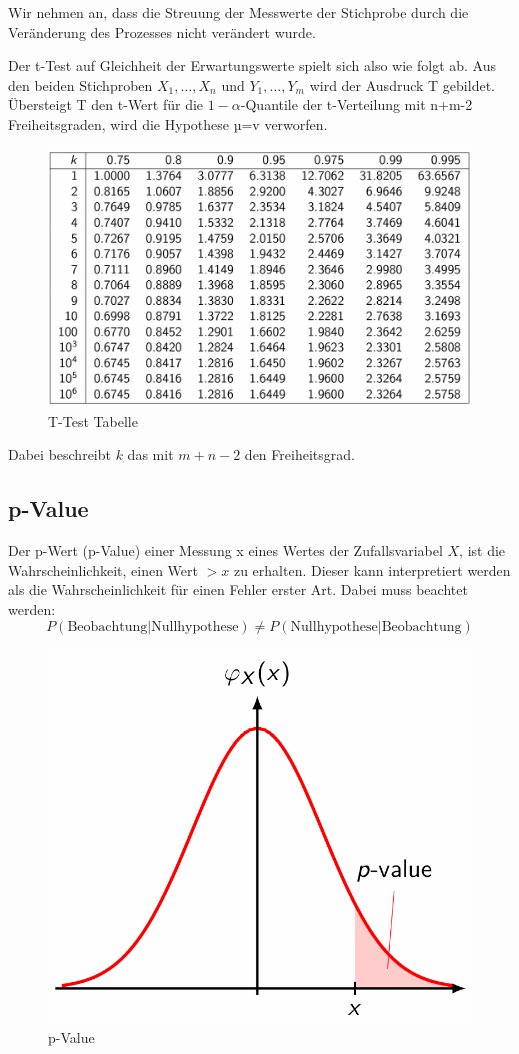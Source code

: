 \documentclass[../Main.tex]{subfiles}
\begin{document}
Wir nehmen an, dass die Streuung der Messwerte der Stichprobe durch die Veränderung des Prozesses
nicht verändert wurde.

Der t-Test auf Gleichheit der Erwartungswerte spielt sich also wie folgt ab. Aus den beiden
Stichproben \(X_1,\dots,X_n\) und \(Y_1,\dots,Y_m\) wird der Ausdruck T gebildet. Übersteigt T den
t-Wert für die \(1-\alpha\)-Quantile der t-Verteilung mit n+m-2 Freiheitsgraden, wird die Hypothese
µ=v verworfen.

\begin{figure}[H]
    \centering
    \includegraphics[width=1\linewidth]{Images/t-test-tabelle.png}
    \caption{T-Test Tabelle}
\end{figure}
Dabei beschreibt \(k\) das mit \(m+n-2\) den Freiheitsgrad.

\subsection{p-Value}
Der p-Wert (p-Value) einer Messung x eines Wertes
der Zufallsvariabel \(X\), ist die Wahrscheinlichkeit,
einen Wert \(> x\) zu erhalten.
Dieser kann interpretiert werden als die Wahrscheinlichkeit für einen Fehler erster Art.
Dabei muss beachtet werden:
\begin{equation*}
    P(\text{Beobachtung}|\text{Nullhypothese}) \neq P(\text{Nullhypothese}|\text{Beobachtung})
\end{equation*}

\begin{figure}[H]
    \centering
    \includegraphics[width=0.5\linewidth]{Images/p-value.png}
    \caption{p-Value}
\end{figure}
\end{document}
